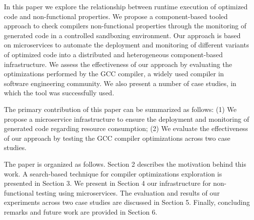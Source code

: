 In this paper we explore the relationship between runtime execution of optimized code and non-functional properties.
We propose a component-based tooled approach to check compilers non-functional properties through the monitoring of generated code in a controlled sandboxing environment. 
Our approach is based on microservices to automate the deployment and monitoring of different variants of optimized code into a distributed and heterogeneous component-based infrastructure. 
We assess the effectiveness of our approach by evaluating the optimizations performed by the GCC compiler, a widely used compiler in software engineering community. 
We also present a number of case studies, in which the tool was successfully used.

The primary contribution of this paper can be summarized as follows: 
(1) We propose a microservice infrastructure to ensure the deployment and monitoring of generated code regarding resource consumption; 
(2) We evaluate the effectiveness of our approach by testing the GCC compiler optimizations across two case studies.
 

The paper is organized as follows.
Section 2 describes the motivation behind this work. A search-based technique for compiler optimizations exploration is presented in Section 3. 
We present in Section 4 our infrastructure for non-functional testing using microservices. 
The evaluation and results of our experiments across two case studies are discussed in Section 5. 
Finally, concluding remarks and future work are provided in Section 6.




 
 

